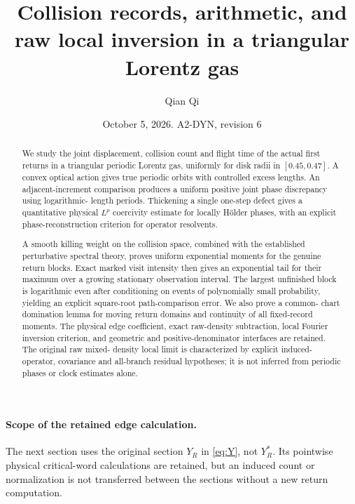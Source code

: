 \documentclass[11pt,reqno]{amsart}
\title[Collision records and raw local inversion]{Collision records, arithmetic, and raw local inversion in a triangular Lorentz gas}
\author{Qian Qi}
\date{October 5, 2026. A2-DYN, revision 6}
\numberwithin{equation}{section}
\theoremstyle{definition}\newtheorem{definition}[theorem]{Definition}
\theoremstyle{remark}\newtheorem{remark}[theorem]{Remark}
\begin{document}
\raggedbottom
\begin{abstract}
We study the joint displacement, collision count and flight time of the
actual first returns in a triangular periodic Lorentz gas, uniformly for
disk radii in $[0.45,0.47]$. A convex optical action gives true periodic
orbits with controlled excess lengths. An adjacent-increment comparison
produces a uniform positive joint phase discrepancy using logarithmic-
length periods. Thickening a single one-step defect gives a quantitative
physical $L^p$ coercivity estimate for locally H\"older phases, with an
explicit phase-reconstruction criterion for operator resolvents.

A smooth killing weight on the collision space, combined with the
established perturbative spectral theory, proves uniform exponential
moments for the genuine return blocks. Exact marked visit intensity then
gives an exponential tail for their maximum over a growing stationary
observation interval. The largest unfinished block is logarithmic even
after conditioning on events of polynomially small probability, yielding
an explicit square-root path-comparison error. We also prove a common-
chart domination lemma for moving return domains and continuity of all
fixed-record moments. The physical edge coefficient, exact raw-density
subtraction, local Fourier inversion criterion, and geometric and
positive-denominator interfaces are retained. The original raw mixed-
density local limit is characterized by explicit induced-operator,
covariance and all-branch residual hypotheses; it is not inferred from
periodic phases or clock estimates alone.
\end{abstract}
\maketitle








\paragraph{Scope of the retained edge calculation.}
The next section uses the original section $Y_R$ in \eqref{eq:Y}, not
$Y_R^*$. Its pointwise physical critical-word calculations are retained,
but an induced count or normalization is not transferred between the
sections without a new return computation.












\clearpage

\end{document}
